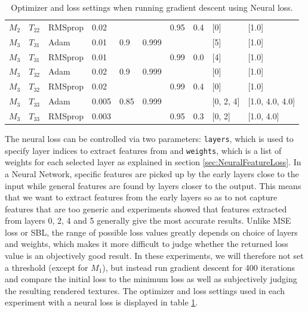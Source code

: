 \begin{table}
\begin{tabular}{ccllllllll}
 $M_2$     & $T_{22}$   & RMSprop    & 0.02       &            &            & 0.95       & 0.4        & [0]        & [1.0]      \\
  $M_3$     & $T_{31}$   & Adam       & 0.01       & 0.9        & 0.999      &            &            & [5]        & [1.0]      \\
 $M_3$     & $T_{31}$   & RMSprop    & 0.01       &            &            & 0.99       & 0.0        & [4]        & [1.0]      \\
 $M_3$     & $T_{32}$   & Adam       & 0.02       & 0.9        & 0.999      &            &            & [0]        & [1.0]      \\
 $M_3$     & $T_{32}$   & RMSprop    & 0.02       &            &            & 0.99       & 0.4        & [0]        & [1.0]      \\
 $M_3$     & $T_{33}$   & Adam       & 0.005      & 0.85       & 0.999      &            &            & [0, 2, 4]  & [1.0, 4.0, 4.0] \\
 $M_3$     & $T_{33}$   & RMSprop    & 0.003      &            &            & 0.95       & 0.3        & [0, 2]     & [1.0, 4.0] \\
\end{tabular}
\caption{Optimizer and loss settings when running gradient descent using Neural loss.}
\label{tab:NeuralLossOptimizerSettings}
\end{table}


The neural loss can be controlled via two parameters: \texttt{layers}, which is used to specify layer indices to extract features from and \texttt{weights}, which is a list of weights for each selected layer as explained in section \ref{sec:NeuralFeatureLoss}. In a Neural Network, specific features are picked up by the early layers close to the input while general features are found by layers closer to the output. This means that we want to extract features from the early layers so as to not capture features that are too generic and experiments showed that features extracted from layers 0, 2, 4 and 5 generally give the most accurate results. Unlike MSE loss or SBL, the range of possible loss values greatly depends on choice of layers and weights, which makes it more difficult to judge whether the returned loss value is an objectively good result. In these experiments, we will therefore not set a threshold (except for $M_1$), but instead run gradient descent for 400 iterations and compare the initial loss to the minimum loss as well as subjectively judging the resulting rendered textures. The optimizer and loss settings used in each experiment with a neural loss is displayed in table \ref{tab:NeuralLossOptimizerSettings}.

